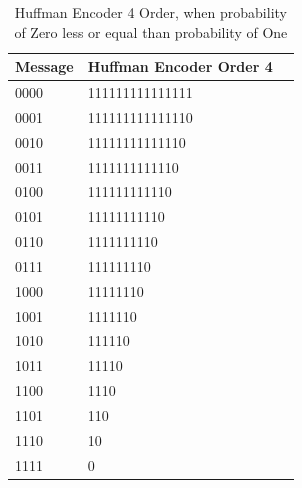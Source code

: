 \begin{refsection}
\begin{table}[H]
\centering
\caption{Huffman Encoder 4 Order, when probability of Zero less or equal than probability of One}
\label{tb:hufmmanencoder6}
\begin{tabular}{|l|l|l|}
\hline
\textbf{Message}                      & \textbf{Huffman Encoder Order 4}                                       \\ \hline
0000                 & 111111111111111                                                         \\ \hline
0001                 & 111111111111110                                              \\ \hline
0010                 & 11111111111110                                            \\ \hline
0011                 & 1111111111110                                       \\ \hline
0100                 & 111111111110                                                          \\ \hline
0101                 & 11111111110                                                          \\ \hline
0110                 & 1111111110                                                         \\ \hline
0111                 & 111111110                                                         \\ \hline
1000                 & 11111110                                                          \\ \hline
1001                 & 1111110                                                          \\ \hline
1010                 & 111110                                                         \\ \hline
1011                 & 11110                                                   \\ \hline
1100                 & 1110                                                          \\ \hline
1101                 & 110                                                          \\ \hline
1110                 & 10                                                         \\ \hline
1111                 & 0                                                         \\ \hline
\end{tabular}
\end{table}



\end{refsection}
